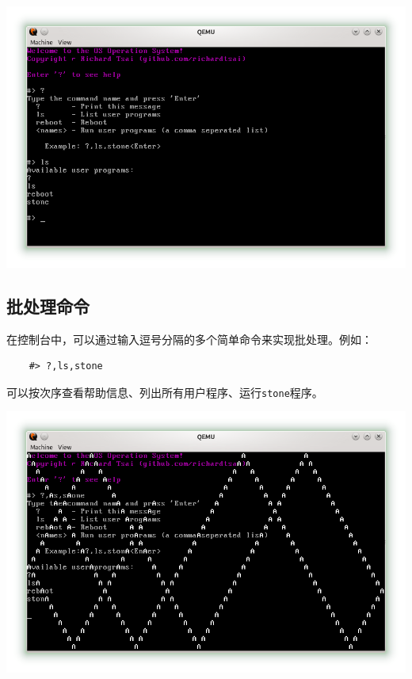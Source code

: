 \documentclass[adobefonts, a4paper]{ctexart}
\begin{document}
\begin{center}
\includegraphics[scale=0.65]{single_cmd.png}
\end{center}

\subsection{批处理命令}
在控制台中，可以通过输入逗号分隔的多个简单命令来实现批处理。例如：

\begin{verbatim}
    #> ?,ls,stone
\end{verbatim}

可以按次序查看帮助信息、列出所有用户程序、运行\verb|stone|程序。

\begin{center}
\includegraphics[scale=0.65]{multiple_cmd.png}
\end{center}
\end{document}
